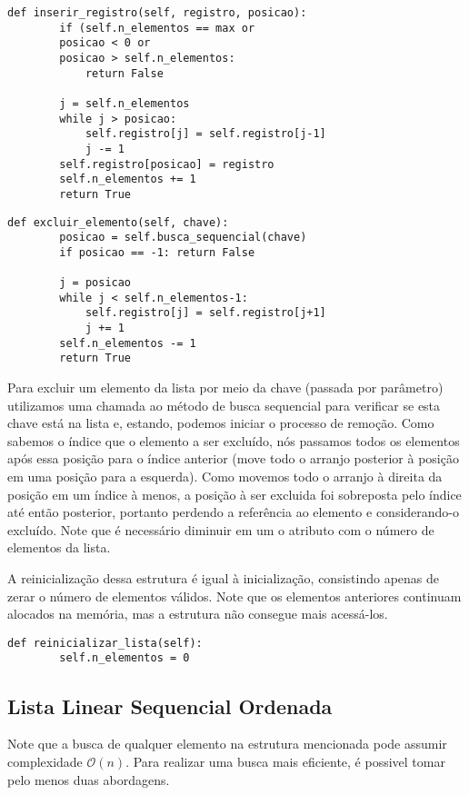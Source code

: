 \documentclass[a4paper, twocolumn]{article}
\theoremstyle{definition}
\begin{document}
\begin{lstlisting}[label=lista_linear_seq,caption= Lista linear sequencial (inserção)]
def inserir_registro(self, registro, posicao):
        if (self.n_elementos == max or 
        posicao < 0 or 
        posicao > self.n_elementos:
            return False

        j = self.n_elementos
        while j > posicao:
            self.registro[j] = self.registro[j-1]
            j -= 1
        self.registro[posicao] = registro
        self.n_elementos += 1
        return True
\end{lstlisting}


\begin{lstlisting}[label=lista_linear_seq,caption= Lista linear sequencial (remoção)]
def excluir_elemento(self, chave):
        posicao = self.busca_sequencial(chave)
        if posicao == -1: return False

        j = posicao
        while j < self.n_elementos-1:
            self.registro[j] = self.registro[j+1]
            j += 1
        self.n_elementos -= 1
        return True
\end{lstlisting}

Para excluir um elemento da lista por meio da chave (passada por parâmetro) utilizamos uma chamada ao método de busca sequencial para verificar se esta chave está na lista e, estando, podemos iniciar o processo de remoção. Como sabemos o índice que o elemento a ser excluído, nós passamos todos os elementos após essa posição para o índice anterior (move todo o arranjo posterior à posição em uma posição para a esquerda). Como movemos todo o arranjo à direita da posição em um índice à menos, a posição à ser excluida foi sobreposta pelo índice até então posterior, portanto perdendo a referência ao elemento e considerando-o excluído. Note que é necessário diminuir em um o atributo com o número de elementos da lista.

A reinicialização dessa estrutura é igual à inicialização, consistindo apenas de zerar o número de elementos válidos. Note que os elementos anteriores continuam alocados na memória, mas a estrutura não consegue mais acessá-los.

\begin{lstlisting}[label=lista_linear_seq,caption= Lista linear sequencial (reinicialização)]
def reinicializar_lista(self):
        self.n_elementos = 0
\end{lstlisting}

\subsection{Lista Linear Sequencial Ordenada}
Note que a busca de qualquer elemento na estrutura mencionada pode assumir complexidade $\mathcal{O}(n)$. Para realizar uma busca mais eficiente, é possivel tomar pelo menos duas abordagens.
\end{document}
